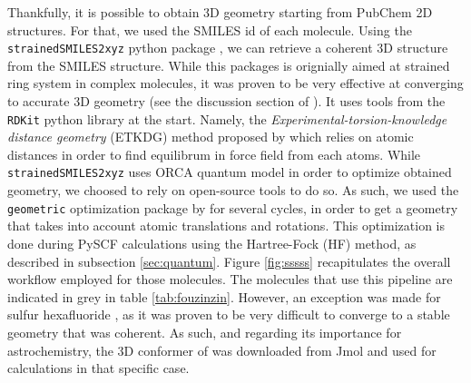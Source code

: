 \documentclass[twocolumn, a4paper, twoside,10pt]{scrartcl}
\begin{document}
Thankfully, it is possible to obtain 3D geometry starting from PubChem 2D structures. For that, we used the SMILES id of each molecule. Using the \verb|strainedSMILES2xyz| python package \citep{demuthStrainedSMILES2xyzWorkflowReliable2026}, we can retrieve a coherent 3D structure from the SMILES structure. While this packages is orignially aimed at strained ring system in complex molecules, it was proven to be very effective at converging to accurate 3D geometry (see the discussion section of \cite{demuthStrainedSMILES2xyzWorkflowReliable2026}). It uses tools from the \verb|RDKit| python library \citep{landrumRdkitRdkit2025_03_42025} at the start. Namely, the \textit{Experimental-torsion-knowledge distance
geometry} (ETKDG) method proposed by \citet{rinikerBetterInformedDistance2015} which relies on atomic distances in order to find equilibrum in  force field from each atoms. While \verb|strainedSMILES2xyz| uses ORCA quantum model \citep{neeseORCAProgramSystem2012} in order to optimize obtained geometry, we choosed to rely on open-source tools to do so. As such, we used the \verb|geometric| optimization package by  \citet{wangGeometryOptimizationMade2016} for several cycles, in order to get a geometry that takes into account atomic translations and rotations. This optimization is done during PySCF calculations using the Hartree-Fock (HF) method, as described in subsection \ref{sec:quantum}. Figure \ref{fig:sssss} recapitulates the overall workflow employed for those molecules. The molecules that use this pipeline are indicated in grey in table \ref{tab:fouzinzin}. However, an exception was made for sulfur hexafluoride , as it was proven to be very difficult to converge to a stable geometry that was coherent. As such, and regarding its importance for astrochemistry, the 3D conformer of  was downloaded from Jmol and used for calculations in that specific case.
\end{document}
